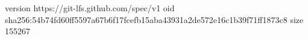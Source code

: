 version https://git-lfs.github.com/spec/v1
oid sha256:54b74fd60ff5597a67b6f17fcefb15aba43931a2de572e16c1b39f71ff1873c8
size 155267
